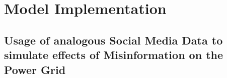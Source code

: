 \chapter{Model Implementation}



\section{Usage of analogous Social Media Data to simulate effects of 
Misinformation on the Power Grid}

